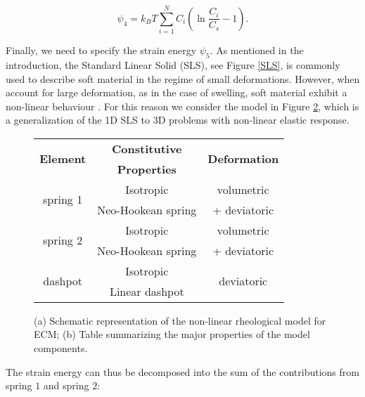 \begin{equation}
\psi_4 = k_B T \sum\limits_{i=1}^{N} C_i \left(\ln \frac{C_i}{ C_s}-1\right).\label{psi4}
\end{equation}

Finally, we need to specify the strain energy $\psi_5$. As mentioned in the introduction, the Standard Linear Solid (SLS), see Figure \ref{SLS}, is commonly used to describe soft material in the regime of small deformations. However, when account for large deformation, as in the case of swelling, soft material exhibit a non-linear behaviour \cite{floryprinciples}. For this reason we consider the model in Figure \ref{fig1A}, which is a generalization of the 1D SLS to 3D problems with non-linear elastic response. 

\begin{figure}
	\begin{subfigure}{0.32\textwidth}
		\centering
		\large
		\def\svgwidth{0.9\linewidth}
		
		\caption{}
		\label{fig1A}
	\end{subfigure}
	\hspace{20mm}
	\begin{subtable}{0.375\textwidth}
		\hspace{-15mm}
		\begin{tabular}{|c | c | c|}	
			\hline
			\multirow{2}{*}{\textbf{ Element } }& \textbf{ Constitutive } & \multirow{2}{*}{\textbf{ Deformation }} \\
			& \textbf{Properties} &\\
			\hline	
			\multirow{2}{*}{ spring 1 } & Isotropic  & volumetric\\
			&Neo-Hookean spring& + deviatoric\\
			\hline
			\multirow{2}{*}{ spring 2 } & Isotropic  & volumetric\\
			&Neo-Hookean spring &+ deviatoric\\ 
			\hline
			\multirow{2}{*}{dashpot}  & Isotropic  & 	\multirow{2}{*}{deviatoric}\\
			& Linear dashpot & \\
			\hline
		\end{tabular}
		\caption{}
	\end{subtable}
	\caption{(a) Schematic representation of the non-linear rheological model for ECM; (b) Table summarizing the major properties of the model components.}
\end{figure}

The strain energy can thus be decomposed into the sum of the contributions from spring $1$ and spring $2$:


